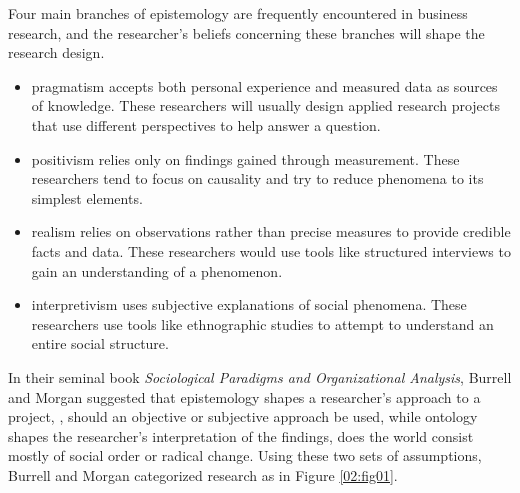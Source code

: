 Four main branches of epistemology are frequently encountered in business research, and the researcher's beliefs concerning these branches will shape the research design.

\begin{itemize}
	\item \Gls{pragmatism} accepts both personal experience and measured data as sources of knowledge. These researchers will usually design applied research projects that use different perspectives to help answer a question.

	\item \Gls{positivism} relies only on findings gained through measurement. These researchers tend to focus on causality and try to reduce phenomena to its simplest elements.

	\item \Gls{realism} relies on observations rather than precise measures to provide credible facts and data. These researchers would use tools like structured interviews to gain an understanding of a phenomenon.

	\item \Gls{interpretivism} uses subjective explanations of social phenomena. These researchers use tools like ethnographic studies to attempt to understand an entire social structure.
\end{itemize}

In their seminal book \textit{Sociological Paradigms and Organizational Analysis}\cite{burrell2017sociological}, Burrell and Morgan suggested that epistemology shapes a researcher's approach to a project, \eg, should an objective or subjective approach be used, while ontology shapes the researcher's interpretation of the findings, \eg does the world consist mostly of social order or radical change. Using these two sets of assumptions, Burrell and Morgan categorized research as in Figure \ref{02:fig01}.

